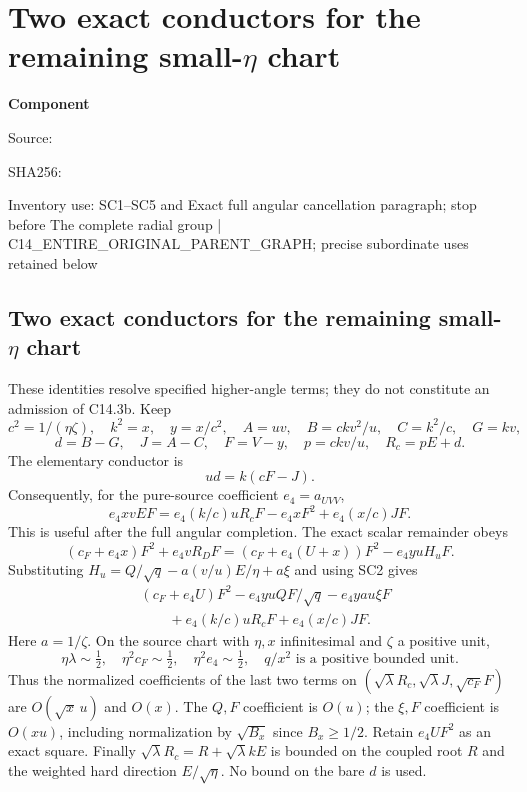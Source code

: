 \chapter{Two exact conductors for the remaining small-$\eta$ chart}
\label{component:peea9e9c546c5}
\noindent\textbf{Component }\par
{\small\noindent Source: \par}
{\small\noindent SHA256: \par}
{\small\noindent Inventory use: SC1--SC5 and Exact full angular cancellation paragraph; stop before The complete radial group | C14\_\allowbreak{}ENTIRE\_\allowbreak{}ORIGINAL\_\allowbreak{}PARENT\_\allowbreak{}GRAPH; precise subordinate uses retained below\par}
\medskip
\section{Two exact conductors for the remaining small-$\eta$ chart}
These identities resolve specified higher-angle terms; they do not
constitute an admission of C14.3b. Keep
\[
 c^2=1/(\eta\zeta),\quad k^2=x,\quad y=x/c^2,\quad
 A=uv,\quad B=ckv^2/u,\quad C=k^2/c,\quad G=kv,
\]
\[
 d=B-G,\quad J=A-C,\quad F=V-y,\quad
 p=ckv/u,\quad R_c=pE+d.
\]
The elementary conductor is
\[
                         ud=k(cF-J).                 \tag{SC1}
\]
Consequently, for the pure-source coefficient $e_4=a_{UVV}$,
\[
 e_4xvEF=e_4(k/c)uR_cF-e_4xF^2+e_4(x/c)JF.           \tag{SC2}
\]
This is useful after the full angular completion. The exact scalar
remainder obeys
\[
 (c_F+e_4x)F^2+e_4vR_DF
       =(c_F+e_4(U+x))F^2-e_4yuH_uF.
\]
Substituting
$H_u=Q/\sqrt q-a(v/u)E/\eta+a\xi$ and using SC2 gives
\[
\begin{split}
 &(c_F+e_4U)F^2-e_4yuQF/\sqrt q-e_4ya u\xi F\\
 &\qquad+e_4(k/c)uR_cF+e_4(x/c)JF.
\end{split}                                             \tag{SC3}
\]
Here $a=1/\zeta$. On the source chart with $\eta,x$ infinitesimal
and $\zeta$ a positive unit,
\[
 \eta\lambda\sim\tfrac12,\quad
 \eta^2c_F\sim\tfrac12,\quad \eta^2e_4\sim\tfrac12,
 \quad q/x^2\text{ is a positive bounded unit}.
\]
Thus the normalized coefficients of the last two terms on
$(\sqrt\lambda R_c,\sqrt\lambda J,\sqrt{c_F}F)$ are
$O(\sqrt x\,u)$ and $O(x)$. The $Q,F$ coefficient is $O(u)$;
the $\xi,F$ coefficient is $O(xu)$, including normalization by
$\sqrt{B_x}$ since $B_x\ge1/2$. Retain $e_4UF^2$ as an exact
square. Finally $\sqrt\lambda R_c=R+\sqrt\lambda kE$ is
bounded on the coupled root $R$ and the weighted hard direction
$E/\sqrt\eta$. No bound on the bare $d$ is used.

